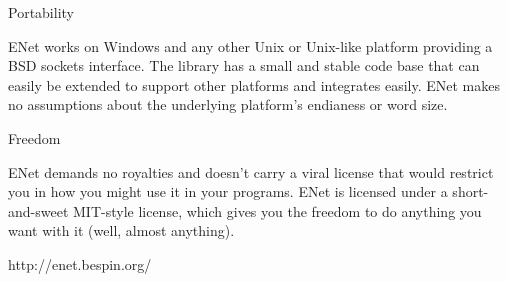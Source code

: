 Portability

ENet works on Windows and any other Unix or Unix-like platform providing a BSD sockets interface. The library has a small and stable code base that can easily be extended to support other platforms and integrates easily. ENet makes no assumptions about the underlying platform's endianess or word size.

Freedom

ENet demands no royalties and doesn't carry a viral license that would restrict you in how you might use it in your programs. ENet is licensed under a short-and-sweet MIT-style license, which gives you the freedom to do anything you want with it (well, almost anything).

http://enet.bespin.org/
